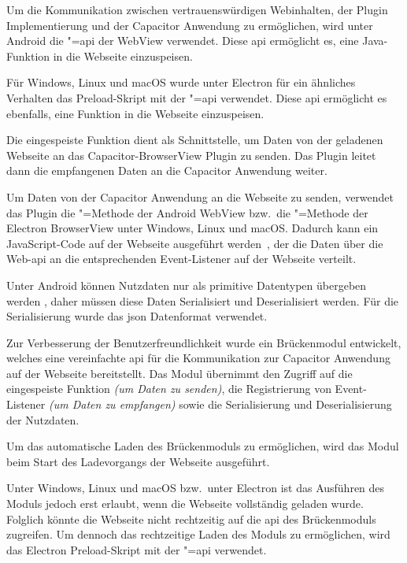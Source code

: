 Um die Kommunikation zwischen vertrauenswürdigen Webinhalten, der Plugin Implementierung und der Capacitor Anwendung zu ermöglichen, wird unter Android die "=\acs{api} der WebView verwendet.
Diese \ac{api} ermöglicht es, eine Java-Funktion in die Webseite einzuspeisen.~\cite{android:api}

Für Windows, Linux und macOS wurde unter Electron für ein ähnliches Verhalten das Preload-Skript mit der "=\acs{api} verwendet.
Diese \ac{api} ermöglicht es ebenfalls, eine Funktion in die Webseite einzuspeisen.~\cite{electron:docs}

Die eingespeiste Funktion dient als Schnittstelle, um Daten von der geladenen Webseite an das Capacitor-BrowserView Plugin zu senden.
Das Plugin leitet dann die empfangenen Daten an die Capacitor Anwendung weiter.

Um Daten von der Capacitor Anwendung an die Webseite zu senden, verwendet das Plugin die "=Methode der Android WebView bzw.\ die "=Methode der Electron BrowserView unter Windows, Linux und macOS\@.
Dadurch kann ein JavaScript-Code auf der Webseite ausgeführt werden~\cite{android:api, electron:docs}, der die Daten über die  Web-\acs{api} an die entsprechenden Event-Listener auf der Webseite verteilt.~\cite{web:api}

Unter Android können Nutzdaten nur als primitive Datentypen übergeben werden \cite{android:api}, daher müssen diese Daten Serialisiert und Deserialisiert werden.
Für die Serialisierung wurde das \ac{json} Datenformat verwendet.

Zur Verbesserung der Benutzerfreundlichkeit wurde ein Brückenmodul entwickelt, welches eine vereinfachte \ac{api} für die Kommunikation zur Capacitor Anwendung auf der Webseite bereitstellt.
Das Modul übernimmt den Zugriff auf die eingespeiste Funktion \textit{(um Daten zu senden)}, die Registrierung von Event-Listener \textit{(um Daten zu empfangen)} sowie die Serialisierung und Deserialisierung der Nutzdaten.

Um das automatische Laden des Brückenmoduls zu ermöglichen, wird das Modul beim Start des Ladevorgangs der Webseite ausgeführt.

Unter Windows, Linux und macOS bzw.\ unter Electron ist das Ausführen des Moduls jedoch erst erlaubt, wenn die Webseite vollständig geladen wurde.
Folglich könnte die Webseite nicht rechtzeitig auf die \ac{api} des Brückenmoduls zugreifen.
Um dennoch das rechtzeitige Laden des Moduls zu ermöglichen, wird das Electron Preload-Skript mit der "=\acs{api} verwendet.
\cite{electron:docs}
